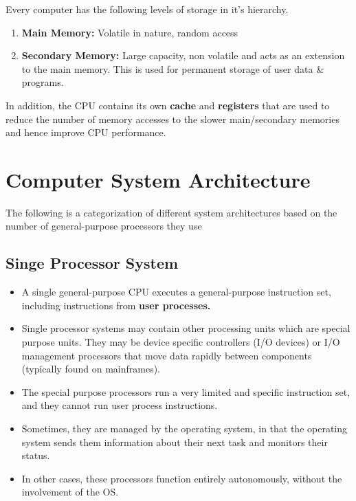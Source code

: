 \documentclass{article}
\theoremstyle{plain}
\theoremstyle{definition}
\begin{document}
Every computer has the following levels of storage in it's hierarchy.

\begin{enumerate}
    \item \textbf{Main Memory:} Volatile in nature, random access
    
    \item \textbf{Secondary Memory:} Large capacity, non volatile and acts as an extension to the main memory. This is used for permanent storage of user data \& programs.
\end{enumerate}
In addition, the CPU contains its own \textbf{cache} and \textbf{registers} that are used to reduce the number of memory accesses to the slower main/secondary memories and hence improve CPU performance.\\

\section{Computer System Architecture}
The following is a categorization of different system architectures based on the number of general-purpose processors they use

\subsection{Singe Processor System}

\begin{itemize}
    \item A single general-purpose CPU executes a general-purpose instruction set, including instructions from \textbf{user processes.}
    
    \item Single processor systems may contain other processing units which are special purpose units. They may be device specific controllers (I/O devices) or I/O management processors that move data rapidly between components (typically found on mainframes).
    
    \item The special purpose processors run a very limited and specific instruction set, and they cannot run user process instructions.
    
    \item Sometimes, they are managed by the operating system, in that the operating system sends them information about their next task and monitors their status.
    
    \item In other cases, these processors function entirely autonomously, without the involvement of the OS.
\end{itemize}
\end{document}
